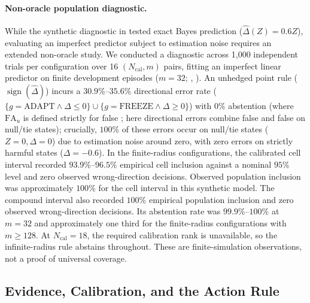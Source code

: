 \paragraph{Non-oracle population diagnostic.}
While the synthetic diagnostic in  tested exact Bayes prediction ($\widehat\Delta(Z) = 0.6Z$), evaluating an imperfect predictor subject to estimation noise requires an extended non-oracle study. We conducted a diagnostic across 1,000 independent trials per configuration over 16 $(N_{\mathrm{cal}}, m)$ pairs, fitting an imperfect linear predictor on finite development episodes ($m=32$; , ).
An unhedged point rule ($\operatorname{sign}(\widehat\Delta)$) incurs a $30.9\%$--$35.6\%$ directional error rate ($\{g = \text{ADAPT} \wedge \Delta \le 0\} \cup \{g = \text{FREEZE} \wedge \Delta \ge 0\}$) with $0\%$ abstention (where $\mathrm{FA}_u$ is defined strictly for false \adapt; here directional errors combine false \adapt and false \freeze on null/tie states); crucially, $100\%$ of these errors occur on null/tie states ($Z=0, \Delta=0$) due to estimation noise around zero, with zero errors on strictly harmful states ($\Delta = -0.6$). In the finite-radius configurations, the calibrated cell interval recorded $93.9\%$--$96.5\%$ empirical cell inclusion against a nominal $95\%$ level and zero observed wrong-direction decisions. Observed population inclusion was approximately $100\%$ for the cell interval in this synthetic model. The compound interval also recorded $100\%$ empirical population inclusion and zero observed wrong-direction decisions. Its abstention rate was $99.9\%$--$100\%$ at $m=32$ and approximately one third for the finite-radius configurations with $m\ge128$. At $N_{\mathrm{cal}}=18$, the required calibration rank is unavailable, so the infinite-radius rule abstains throughout. These are finite-simulation observations, not a proof of universal coverage.


\subsection{Evidence, Calibration, and the Action Rule}

